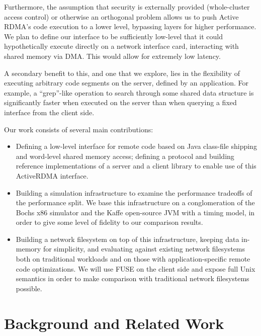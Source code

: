 \documentclass[10pt]{article}
\begin{document}
Furthermore, the assumption that security is externally provided
(whole-cluster access control) or otherwise an orthogonal problem
allows us to push Active RDMA's code execution to a lower level,
bypassing layers for higher performance. We plan to define our
interface to be sufficiently low-level that it could hypothetically
execute directly on a network interface card, interacting with shared
memory via DMA. This would allow for extremely low latency.

A secondary benefit to this, and one that we explore, lies in the
flexibility of executing arbitrary code segments on the server,
defined by an application. For example, a ``grep''-like operation to
search through some shared data structure is significantly faster when
executed on the server than when querying a fixed interface from the
client side.

Our work consists of several main contributions:

\begin{itemize} \itemsep -2pt

\item Defining a low-level interface for remote code based on Java
  class-file shipping and word-level shared memory access; defining a
  protocol and building reference implementations of a server and a
  client library to enable use of this ActiveRDMA interface.

\item Building a simulation infrastructure to examine the performance
  tradeoffs of the performance split. We base this infrastructure on a
  conglomeration of the Bochs x86 simulator and the Kaffe open-source
  JVM with a timing model, in order to give some level of fidelity to
  our comparison results.

\item Building a network filesystem on top of this infrastructure,
  keeping data in-memory for simplicity, and evaluating against
  existing network filesystems both on traditional workloads and on
  those with application-specific remote code optimizations. We will
  use FUSE on the client side and expose full Unix semantics in order
  to make comparison with traditional network filesystems possible.

\end{itemize}

\section{Background and Related Work}
\end{document}

